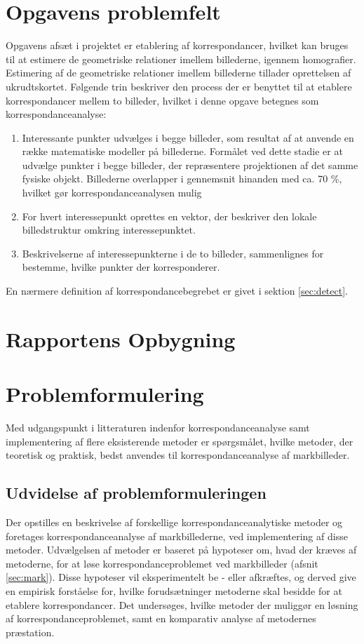 \section{Opgavens problemfelt} \label{subsec:felt}
Opgavens afsæt i projektet er etablering af korrespondancer, hvilket kan bruges til at estimere de geometriske relationer imellem billederne, igennem homografier. Estimering af de geometriske relationer imellem billederne tillader oprettelsen af ukrudtskortet. Følgende trin beskriver den process der er benyttet til at etablere korrespondancer mellem to billeder, hvilket i denne opgave betegnes som korrespondanceanalyse:
\begin{enumerate}
\item{Interessante punkter udvælges i begge billeder, som resultat af at anvende en række matematiske modeller på billederne. Formålet ved dette stadie er at udvælge  punkter i begge billeder, der repræsentere projektionen af det samme fysiske objekt. Billederne overlapper i gennemsnit hinanden med ca. 70 \%, hvilket gør korrespondanceanalysen mulig}
\item{For hvert interessepunkt oprettes en vektor, der beskriver den lokale billedstruktur omkring interessepunktet.}
\item{Beskrivelserne af interessepunkterne i de to billeder, sammenlignes for bestemme, hvilke punkter der korresponderer.}
\end{enumerate}
En nærmere definition af korrespondancebegrebet er givet i sektion \ref{sec:detect}.
\section{Rapportens Opbygning}
\section{Problemformulering} \label{subsec:form}
Med udgangspunkt i litteraturen indenfor
korrespondanceanalyse samt implementering af
flere eksisterende metoder er spørgsmålet, hvilke metoder, der teoretisk og praktisk, bedst anvendes til korrespondanceanalyse af markbilleder.
\subsection{Udvidelse af problemformuleringen}
Der opstilles en beskrivelse af forskellige korrespondanceanalytiske metoder og foretages korrespondanceanalyse af markbillederne, ved implementering af disse metoder. Udvælgelsen af metoder er baseret på hypoteser om, hvad der kræves af metoderne, for at løse korrespondanceproblemet ved markbilleder (afsnit \ref{sec:mark}). Disse hypoteser vil eksperimentelt be - eller afkræftes, og derved give en empirisk forståelse for, hvilke forudsætninger metoderne skal besidde for at etablere korrespondancer. 
Det undersøges, hvilke metoder der muliggør en løsning af korrespondanceproblemet, samt en komparativ analyse af metodernes præstation.
